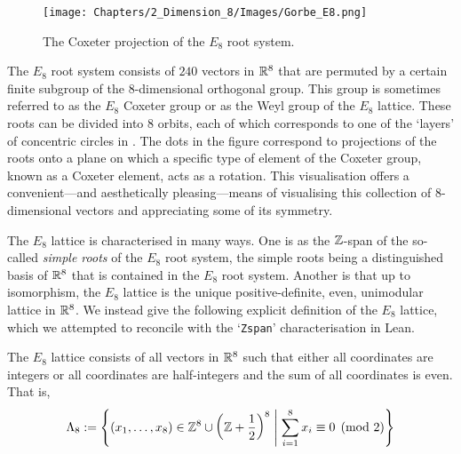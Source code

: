 \begin{wrapfigure}[19]{r}{0.5\linewidth}
    \centering
    \texttt{[image: Chapters/2\_Dimension\_8/Images/Gorbe\_E8.png]}
    \caption{The Coxeter projection of the $E_8$ root system. \cite{Gorbe_E8}}
    \label{Ch2:Fig:Gorbe_E8}
\end{wrapfigure}

The $E_8$ root system consists of $240$ vectors in $\mathbb{R}^8$ that are permuted by a certain finite subgroup of the $8$-dimensional orthogonal group. This group is sometimes referred to as the $E_8$ Coxeter group or as the Weyl group of the $E_8$ lattice. These roots can be divided into $8$ orbits, each of which corresponds to one of the `layers' of concentric circles in . The dots in the figure correspond to projections of the roots onto a plane on which a specific type of element of the Coxeter group, known as a Coxeter element, acts as a rotation. This visualisation offers a convenient---and aesthetically pleasing---means of visualising this collection of $8$-dimensional vectors and appreciating some of its symmetry.

The $E_8$ lattice is characterised in many ways. One is as the $\mathbb{Z}$-span of the so-called \textit{simple roots} of the $E_8$ root system, the simple roots being a distinguished basis of $\mathbb{R}^8$ that is contained in the $E_8$ root system. Another is that up to isomorphism, the $E_8$ lattice is the unique positive-definite, even, unimodular lattice in $\mathbb{R}^8$. We instead give the following explicit definition of the $E_8$ lattice, which we attempted to reconcile with the `\verb|Zspan|' characterisation in Lean.

\begin{boxdefinition}\label{Ch2:Def:E8_Lattice}
    The $E_8$ lattice consists of all vectors in $\mathbb{R}^8$ such that either all coordinates are integers or all coordinates are half-integers and the sum of all coordinates is even. That is,
    \begin{align*}
        \Lambda_8 := \left\{ \left( x_1, \ldots, x_8 \right) \in \mathbb{Z}^8 \cup \left( \mathbb{Z} + \frac{1}{2} \right)^8 \; \middle\vert \; \sum_{i=1}^{8} x_i \equiv 0 \pmod{2} \right\}
    \end{align*}
\end{boxdefinition}

